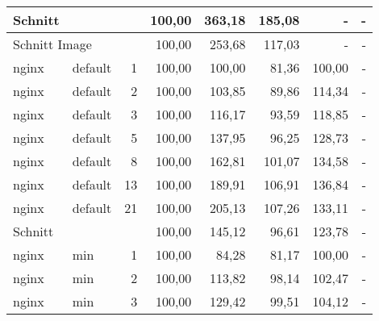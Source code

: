 \begin{footnotesize}
\begin{longtable}{llrrrrrr}
		Schnitt        &         &            & 100,00 & 363,18                      & 185,08                      & -                           & -                           \\ \hline
		\multicolumn{2}{l}{Schnitt Image} &            & 100,00 & 253,68                      & 117,03                      & -                           & -                           \\ \hline
		nginx          & default & 1          & 100,00 & \cellcolor[HTML]{C0C0C0}100,00 & 81,36                       & \cellcolor[HTML]{C0C0C0}100,00 & -                           \\
		nginx          & default & 2          & 100,00 & 103,85                      & 89,86                       & 114,34                      & -                           \\
		nginx          & default & 3          & 100,00 & 116,17                      & 93,59                       & 118,85                      & -                           \\
		nginx          & default & 5          & 100,00 & 137,95                      & 96,25                       & 128,73                      & -                           \\
		nginx          & default & 8          & 100,00 & 162,81                      & 101,07                      & 134,58                      & -                           \\
		nginx          & default & 13         & 100,00 & 189,91                      & 106,91                      & 136,84                      & -                           \\
		nginx          & default & 21         & 100,00 & 205,13                      & 107,26                      & 133,11                      & -                           \\ \hline
		Schnitt        &         &            & 100,00 & 145,12                      & 96,61                       & 123,78                      & -                           \\ \hline
		nginx          & min     & 1          & 100,00 & 84,28                       & 81,17                       & \cellcolor[HTML]{C0C0C0}100,00 & -                           \\
		nginx          & min     & 2          & 100,00 & 113,82                      & 98,14                       & 102,47                      & -                           \\
		nginx          & min     & 3          & 100,00 & 129,42                      & 99,51                       & 104,12                      & -                           \\

\end{longtable}
\end{footnotesize}
